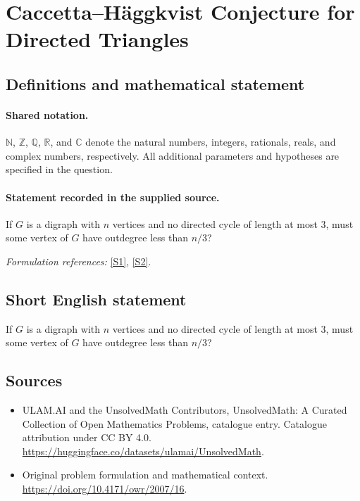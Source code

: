 \documentclass[11pt]{article}
\newcommand{\sref}[2]{\hyperlink{source:#1:#2}{[S#2]}}
\begin{document}
\section{Caccetta–Häggkvist Conjecture for Directed Triangles}\label{statement}

\subsection{Definitions and mathematical statement}

\paragraph{Shared notation.}$\mathbb N$, $\mathbb Z$, $\mathbb Q$, $\mathbb R$, and $\mathbb C$ denote the natural numbers, integers, rationals, reals, and complex numbers, respectively. All additional parameters and hypotheses are specified in the question.


\paragraph{Statement recorded in the supplied source.}
If $G$ is a digraph with $n$ vertices and no directed cycle of length at most $3$, must some vertex of $G$ have outdegree less than $n/3$?
\par\smallskip\textit{Formulation references:} \sref{statement}{1}, \sref{statement}{2}.
\subsection{Short English statement}
If $G$ is a digraph with $n$ vertices and no directed cycle of length at most $3$, must some vertex of $G$ have outdegree less than $n/3$?
\subsection{Sources}
\begin{itemize}
\item[\hypertarget{source:statement:1}{S1}] ULAM.AI and the UnsolvedMath Contributors, UnsolvedMath: A Curated Collection of Open Mathematics Problems, catalogue entry. Catalogue attribution under CC BY 4.0.
\url{https://huggingface.co/datasets/ulamai/UnsolvedMath}.
\item[\hypertarget{source:statement:2}{S2}] Original problem formulation and mathematical context.
\url{https://doi.org/10.4171/owr/2007/16}.
\end{itemize}
\label{end:statement}
\end{document}
